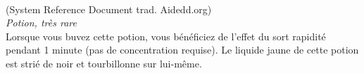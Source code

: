 \\
{\small (System Reference Document trad. Aidedd.org)}\\
{\small \it Potion, très rare}\\
Lorsque vous buvez cette potion, vous bénéficiez de l'effet du sort rapidité pendant 1 minute (pas de concentration requise). Le liquide jaune de cette potion est strié de noir et tourbillonne sur lui-même. \\


